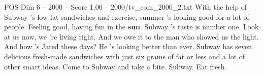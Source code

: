 \begin{textsample}{POS Dim 6 – 2000 – Score 1.00 – 2000/tv\_com\_2000\_2.txt}  \label{ex:f6_pos_083}
With the help of Subway 's low-fat sandwiches and exercise, summer 's looking good for a lot of people.
Feeling good, having fun in the \textbf{sun}.
Subway 's taste is number one.
Look at us now, we 're living right.
And we owe it to the man who showed us the light.
And how 's Jared these days?
He 's looking better than ever.
Subway has seven delicious fresh-made sandwiches with just six grams of fat or less and a lot of other smart ideas.
Come to Subway and take a bite.
Subway.
Eat fresh.

\end{textsample}
